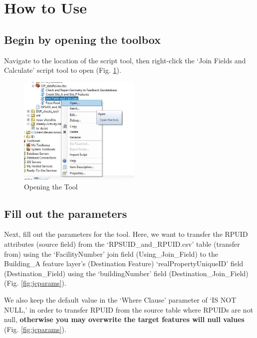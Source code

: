 \documentclass[openany]{book}
\theoremstyle{definition}
\theoremstyle{definition}
\theoremstyle{definition}
\theoremstyle{remark}
\begin{document}
\section{How to Use}\label{how-to-use-2}

\subsection{Begin by opening the
toolbox}\label{begin-by-opening-the-toolbox-2}

Navigate to the location of the script tool, then right-click the `Join
Fields and Calculate' script tool to open (Fig. \ref{fig:jcopen}).

\begin{figure}[H]

{\centering \includegraphics[width=2.3in,]{figures/joinCalcopentool} 

}

\caption{Opening the Tool}\label{fig:jcopen}
\end{figure}

\subsection{Fill out the parameters}\label{fill-out-the-parameters-2}

Next, fill out the parameters for the tool. Here, we want to transfer
the RPUID attributes (source field) from the `RPSUID\_and\_RPUID.csv'
table (transfer from) using the `FacilityNumber' join field
(Using\_Join\_Field) to the Building\_A feature layer's (Destination
Feature) `realPropertyUniqueID' field (Destination\_Field) using the
`buildingNumber' field (Destination\_Join\_Field) (Fig.
\ref{fig:jcparams}).

We also keep the default value in the `Where Clause' parameter of `IS
NOT NULL,' in order to transfer RPUID from the source table where RPUIDs
are not null, \textbf{otherwise you may overwrite the target features
will null values} (Fig. \ref{fig:jcparams}).
\end{document}
